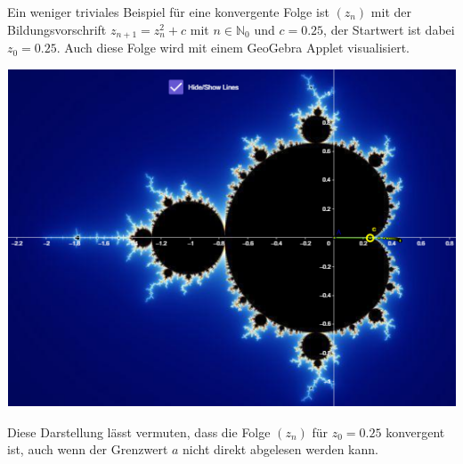 \documentclass[a4paper, 12pt]{book}
\begin{document}
Ein weniger triviales Beispiel für eine konvergente Folge ist
\(\left( z_{n} \right)\) mit der Bildungsvorschrift
\(z_{n + 1} = z_{n}^{2} + c\) mit \(n \in \mathbb{N}_{0}\) und
\(c = 0.25\), der Startwert ist dabei \(z_{0} = 0.25\). Auch
diese Folge wird mit einem GeoGebra Applet visualisiert.

\includegraphics[width=\linewidth]{image11.png}


Diese Darstellung lässt vermuten, dass die Folge
\(\left( z_{n} \right)\) für \(z_{0} = 0.25\) konvergent ist, auch
wenn der Grenzwert \(a\) nicht direkt abgelesen werden kann.
\end{document}
